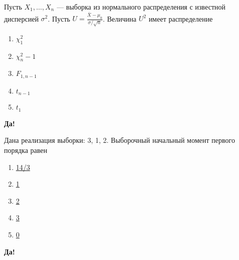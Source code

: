 \documentclass[t]{beamer}
\begin{document}
 \begin{frame} \label{19-Yes} 
\begin{block}{19} 

  Пусть $X_1,\ldots,X_n$ — выборка из нормального распределения с известной дисперсией $\sigma^2$. Пусть $U = \frac{\bar{X}-\mu_0}{\sigma/\sqrt{n}}$. Величина $U^2$ имеет распределение
  


 \end{block} 
\begin{enumerate} 
\item[] \hyperlink{19-Yes}{\beamergotobutton{} $\chi^2_1$}
\item[] \hyperlink{19-No}{\beamergotobutton{} $\chi^2_n-1$}
\item[] \hyperlink{19-No}{\beamergotobutton{} $F_{1,n-1}$}
\item[] \hyperlink{19-No}{\beamergotobutton{} $t_{n-1}$}
\item[] \hyperlink{19-No}{\beamergotobutton{} $t_1$}
\end{enumerate} 

 \textbf{Да!} 
 \hyperlink{20}{}\end{frame} 


 \begin{frame} \label{20-Yes} 
\begin{block}{20} 

  Дана реализация выборки: 3, 1, 2. Выборочный начальный момент первого порядка равен
  


 \end{block} 
\begin{enumerate} 
\item[] \hyperlink{20-No}{\beamergotobutton{} 14/3}
\item[] \hyperlink{20-No}{\beamergotobutton{} 1}
\item[] \hyperlink{20-Yes}{\beamergotobutton{} 2}
\item[] \hyperlink{20-No}{\beamergotobutton{} 3}
\item[] \hyperlink{20-No}{\beamergotobutton{} 0}
\end{enumerate} 

 \textbf{Да!} 
 \hyperlink{21}{}\end{frame} 
\end{document}
